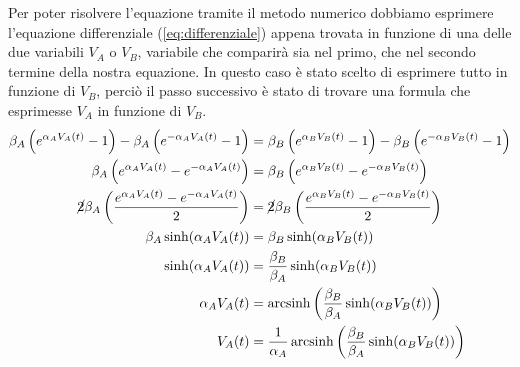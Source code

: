 		Per poter risolvere l'equazione tramite il metodo numerico dobbiamo esprimere l'equazione differenziale (\ref{eq:differenziale}) appena trovata in funzione di una delle due variabili $V_{A}$ o $V_{B}$, variabile che comparirà sia nel primo, che nel secondo termine della nostra equazione. In questo caso è stato scelto di esprimere tutto in funzione di $V_{B}$, perciò il passo successivo è stato di trovare una formula che esprimesse $V_{A}$ in funzione di $V_{B}$.
		\begin{equation}
			\label{eq:tensione_A_B}
			\begin{split}
				\beta_{A}\left(e^{\alpha_{A}V_{A}(t)}-1\right)-\beta_{A}\left(e^{-\alpha_{A}V_{A}(t)}-1\right) &= \beta_{B}\left(e^{\alpha_{B}V_{B}(t)}-1\right)-\beta_{B}\left(e^{-\alpha_{B}V_{B}(t)}-1\right)\\
				\beta_{A}\left(e^{\alpha_{A}V_{A}(t)}-e^{-\alpha_{A}V_{A}(t)}\right) &= \beta_{B}\left(e^{\alpha_{B}V_{B}(t)}-e^{-\alpha_{B}V_{B}(t)}\right)\\
				\cancel{2}\beta_{A}\left(\frac{e^{\alpha_{A}V_{A}(t)}-e^{-\alpha_{A}V_{A}(t)}}{2}\right) &= \cancel{2}\beta_{B}\left(\frac{e^{\alpha_{B}V_{B}(t)}-e^{-\alpha_{B}V_{B}(t)}}{2}\right)\\
				\beta_{A} \sinh(\alpha_{A}V_{A}(t)) &= \beta_{B} \sinh(\alpha_{B}V_{B}(t))\\
				\sinh(\alpha_{A}V_{A}(t)) &= \frac{\beta_{B}}{\beta_{A}} \sinh(\alpha_{B}V_{B}(t))\\
				\alpha_{A}V_{A}(t) &= \operatorname{arcsinh} \left(\frac{\beta_{B}}{\beta_{A}} \sinh(\alpha_{B}V_{B}(t))\right)\\
				V_{A}(t) &= \frac{1}{\alpha_{A}} \operatorname{arcsinh} \left(\frac{\beta_{B}}{\beta_{A}} \sinh(\alpha_{B}V_{B}(t))\right)
			\end{split}
		\end{equation}
		\pagebreak
		
